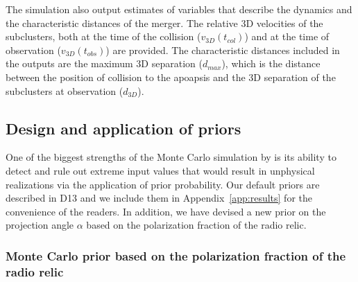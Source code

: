 The simulation also output estimates of variables that describe
the dynamics and the characteristic distances of the merger. The relative
3D velocities of the subclusters, both at the time of the
collision ($v_{3D}(t_{col})$) and at the time of observation
($v_{3D}(t_{obs})$) are provided. The characteristic
distances included in the outputs are the maximum 3D separation ($d_{max}$),
which is the distance between the position of collision to
the apoapsis and the 3D separation of the subclusters at observation
($d_{3D}$). 
\subsection{Design and application of priors} 
\label{sec:priors}
%
One of the biggest strengths of the Monte Carlo simulation by  is its ability
to detect and rule out extreme input values that would result in
unphysical realizations via the application of prior probability. 
Our default priors are described in D13 and we include them in
Appendix~\ref{app:results} for the convenience of the readers. 
In addition, we have devised a new prior on the projection angle $\alpha$
based on the polarization fraction of the radio relic.

\subsubsection{Monte Carlo prior based on the polarization fraction of the radio relic}
%

